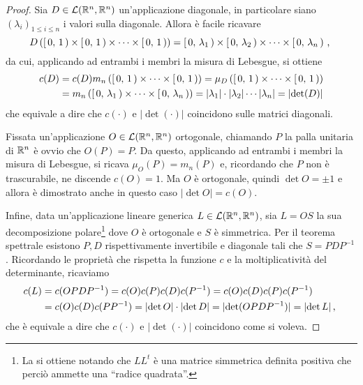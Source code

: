 \begin{proof}
	Sia $D\in\mathcal L(\mathbb R^n,\mathbb R^n)$ un'applicazione diagonale, in particolare siano $(\lambda_i)_{1\le i\le n}$ i valori sulla diagonale.
	Allora è facile ricavare
	\begin{equation*}
		D\left(\left[\,0,\,1\,\right)\times\left[\,0,\,1\,\right)\times\dots\times\left[\,0,\,1\,\right)\right)=\left[\,0,\,\lambda_1\,\right)\times\left[\,0,\,\lambda_2\,\right)\times\cdots\times\left[\,0,\,\lambda_n\,\right)\, \text{, }
	\end{equation*}
	da cui, applicando ad entrambi i membri la misura di Lebesgue, si ottiene
	\begin{align*}
		c(D)&=c(D)m_n\left(\left[\,0,\,1\,\right)\times\dots\times\left[\,0,\,1\,\right)\right)=\mu_D\left(\left[\,0,\,1\,\right)\times\dots\times\left[\,0,\,1\,\right)\right)\\
		&=m_n\left(\left[\,0,\,\lambda_1\,\right)\times\cdots\times\left[\,0,\,\lambda_n\,\right)\right)=
		\lvert\lambda_1\rvert\cdot\lvert\lambda_2\rvert\cdots\lvert\lambda_n\rvert=\lvert\det(D)\rvert
	\end{align*}
	che equivale a dire che $c(\cdot)$ e $\lvert\det(\cdot)\rvert$ coincidono sulle matrici diagonali.
	
	Fissata un'applicazione $O\in\mathcal L(\mathbb R^n,\mathbb R^n)$ ortogonale, chiamando $P$ la palla unitaria di $\mathbb R^n$ è ovvio che $O(P)=P$.
	Da questo, applicando ad entrambi i membri la misura di Lebesgue, si ricava $\mu_O(P)=m_n(P)$ e, ricordando che $P$ non è trascurabile, ne discende $c(O)=1$.
	Ma $O$ è ortogonale, quindi $\det O=\pm 1$ e allora è dimostrato anche in questo caso $\lvert\det O\rvert =c(O)$.
	
	Infine, data un'applicazione lineare generica $L\in\mathcal L(\mathbb R^n,\mathbb R^n)$, sia $L=OS$ la sua decomposizione polare\footnote{La si ottiene notando che $LL^t$ è una matrice simmetrica definita positiva che perciò ammette una ``radice quadrata''.} dove $O$ è ortogonale e $S$ è simmetrica. Per il teorema spettrale esistono $P,D$ rispettivamente invertibile e diagonale tali che $S=PDP^{-1}$.
	Ricordando le proprietà che rispetta la funzione $c$ e la moltiplicatività del determinante, ricaviamo
	\begin{align*}
		c(L)&=c(OPDP^{-1})=c(O)c(P)c(D)c(P^{-1})=c(O)c(D)c(P)c(P^{-1})\\
		&=c(O)c(D)c(PP^{-1})=\lvert\det O\rvert\cdot\lvert\det D\rvert=\lvert \det(OPDP^{-1})\rvert=\lvert\det L\rvert \, \text{, }
	\end{align*}
	che è equivale a dire che $c(\cdot)$ e $\lvert\det(\cdot)\rvert$ coincidono come si voleva.
\end{proof}

